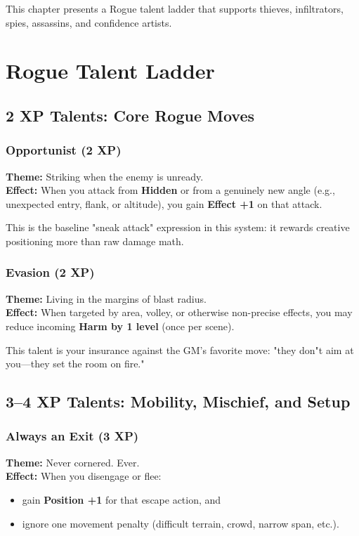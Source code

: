 \documentclass[11pt]{book}
\begin{document}
This chapter presents a Rogue talent ladder that supports
thieves, infiltrators, spies, assassins, and confidence artists.

\section{Rogue Talent Ladder}

\subsection{2 XP Talents: Core Rogue Moves}

\subsubsection{Opportunist (2 XP)}
\textbf{Theme:} Striking when the enemy is unready.\\
\textbf{Effect:} When you attack from \textbf{Hidden} or from a genuinely new angle
(e.g., unexpected entry, flank, or altitude), you gain \textbf{Effect +1}
on that attack.

This is the baseline "sneak attack" expression in this system:
it rewards creative positioning more than raw damage math.

\subsubsection{Evasion (2 XP)}
\textbf{Theme:} Living in the margins of blast radius.\\
\textbf{Effect:} When targeted by area, volley, or otherwise non-precise effects,
you may reduce incoming \textbf{Harm by 1 level} (once per scene).

This talent is your insurance against the GM's favorite move:
"they don"t aim at you---they set the room on fire."

\subsection{3--4 XP Talents: Mobility, Mischief, and Setup}

\subsubsection{Always an Exit (3 XP)}
\textbf{Theme:} Never cornered. Ever.\\
\textbf{Effect:} When you disengage or flee:
\begin{itemize}
  \item gain \textbf{Position +1} for that escape action, and
  \item ignore one movement penalty (difficult terrain, crowd, narrow span, etc.).
\end{itemize}
\end{document}
